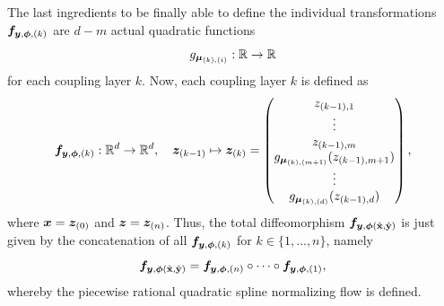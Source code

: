 \documentclass[a4paper,11pt]{report}
\begin{document}
The last ingredients to be finally able to define the individual transformations $\bm{f}_{\bm{y},\bm{\phi},(k)}$ are $d-m$ actual quadratic functions \begin{equation}
g_{\bm{\mu}_{(k),(i)}} : \mathbb{R} \rightarrow \mathbb{R}
\end{equation} for each coupling layer $k$. Now, each coupling layer $k$ is defined as \begin{equation}
\bm{f}_{\bm{y},\bm{\phi},(k)} : \mathbb{R}^d \rightarrow \mathbb{R}^d, \quad \bm{z}_{(k-1)} \mapsto \bm{z}_{(k)} = \begin{pmatrix}
z_{(k-1),1} \\
\vdots \\
z_{(k-1),m} \\
g_{\bm{\mu}_{(k),(m+1)}}(z_{(k-1),m+1}) \\
\vdots \\
g_{\bm{\mu}_{(k),(d)}}(z_{(k-1),d})
\end{pmatrix},
\end{equation} where $\bm{x} = \bm{z}_{(0)}$ and $\bm{z} = \bm{z}_{(n)}$. Thus, the total diffeomorphism $\bm{f}_{\bm{y},\bm{\phi}(\hat{\boldsymbol{\mathbf{x}}},\hat{\boldsymbol{\mathbf{y}}})}$ is just given by the concatenation of all $\bm{f}_{\bm{y},\bm{\phi},(k)}$ for $k \in \{1,\dots,n\}$, namely \begin{equation}
\bm{f}_{\bm{y},\bm{\phi}(\hat{\boldsymbol{\mathbf{x}}},\hat{\boldsymbol{\mathbf{y}}})} = \bm{f}_{\bm{y},\bm{\phi},(n)} \circ \dots \circ \bm{f}_{\bm{y},\bm{\phi},(1)},
\end{equation} whereby the piecewise rational quadratic spline normalizing flow is defined.
\end{document}
